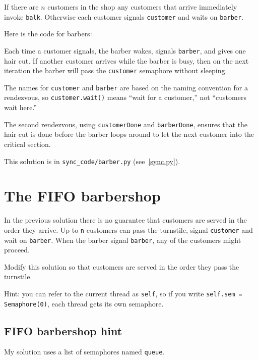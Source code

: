 \documentclass{book}
\begin{document}


If there are $n$ customers in the shop any customers that
arrive immediately invoke {\tt balk}.
Otherwise each customer signals {\tt customer} and waits on
    {\tt barber}.

Here is the code for barbers:



Each time a customer signals,
the barber wakes, signals {\tt barber}, and gives one
hair cut.  If another customer arrives while the barber
is busy, then on the next iteration the barber will pass
the {\tt customer} semaphore without sleeping.

The names for {\tt customer} and {\tt barber} are based on
the naming convention for a rendezvous, so {\tt customer.wait()}
means ``wait for a customer,'' not ``customers wait here.''

The second rendezvous, using {\tt customerDone} and {\tt barberDone},
ensures that the hair cut is done before the barber loops around to
let the next customer into the critical section.

This solution is in \verb"sync_code/barber.py" (see~\ref{sync.py}).



\section{The FIFO barbershop}

In the previous solution there is no guarantee that customers are
served in the order they arrive.  Up to {\tt n} customers can pass
the turnstile, signal
    {\tt customer} and wait on {\tt barber}.  When the barber signal
    {\tt barber}, any of the customers might proceed.

Modify this solution so that customers are served in the order they
pass the turnstile.

Hint: you can refer to the current thread as {\tt self}, so if you
write {\tt self.sem = Semaphore(0)}, each thread gets its own
semaphore.



\subsection{FIFO barbershop hint}

My solution uses a list of semaphores named {\tt queue}.
\end{document}
